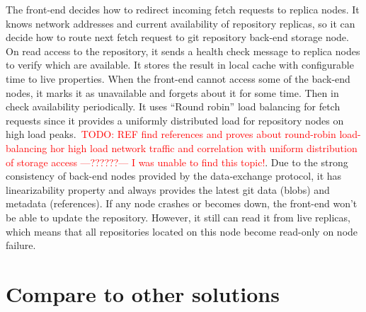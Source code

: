 \documentclass[acmlarge, screen, nonacm, 11pt]{acmart}
\newcommand{\todo}[1]{\textcolor{red}{TODO: #1}}
\begin{document}
The front-end decides how to redirect incoming fetch requests to replica nodes.
It knows network addresses and current availability of repository replicas,
so it can decide how to route next fetch request to git repository back-end storage node.
On read access to the repository, it sends a health check message to replica nodes to verify
which are available. It stores the result in local cache with configurable time to live
properties. When the front-end cannot access some of the back-end nodes, it marks it as unavailable
and forgets about it for some time. Then in check availability periodically.
It uses ``Round robin'' load balancing for fetch requests since it provides a uniformly distributed
load for repository nodes on high load peaks.~\todo{REF find references and proves about round-robin
load-balancing hor high load network traffic and correlation with uniform distribution of storage access ---??????--- I was unable to find this topic!}.
Due to the strong consistency of back-end nodes provided by the data-exchange protocol,
it has linearizability property and always provides the latest git data (blobs) and metadata (references).
If any node crashes or becomes down, the front-end won't be able to update the repository. However, it still can read it from live replicas, which means that all repositories located on this
node become read-only on node failure.

\section{Compare to other solutions}\label{sec:compare}
\end{document}
